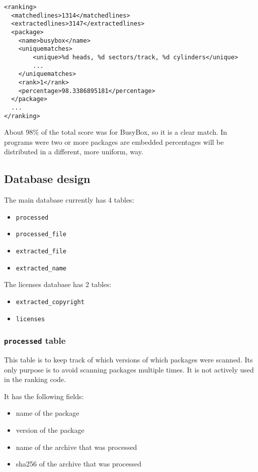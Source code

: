 \documentclass[10pt]{article}
\begin{document}
\begin{verbatim}
<ranking>
  <matchedlines>1314</matchedlines>
  <extractedlines>3147</extractedlines>
  <package>
    <name>busybox</name>
    <uniquematches>
        <unique>%d heads, %d sectors/track, %d cylinders</unique>
        ...
    </uniquematches>
    <rank>1</rank>
    <percentage>98.3386895181</percentage>
  </package>
  ...
</ranking>
\end{verbatim}

About 98\% of the total score was for BusyBox, so it is a clear match. In
programs were two or more packages are embedded percentages will be distributed
in a different, more uniform, way.

\subsection{Database design}

The main database currently has 4 tables:

\begin{itemize}
\item \texttt{processed}
\item \texttt{processed\_file}
\item \texttt{extracted\_file}
\item \texttt{extracted\_name}
\end{itemize}

The licenses database has 2 tables:

\begin{itemize}
\item \texttt{extracted\_copyright}
\item \texttt{licenses}
\end{itemize}

\subsubsection{\texttt{processed} table}

This table is to keep track of which versions of which packages were scanned.
Its only purpose is to avoid scanning packages multiple times. It is not
actively used in the ranking code.

It has the following fields:

\begin{itemize}
\item name of the package
\item version of the package
\item name of the archive that was processed
\item sha256 of the archive that was processed
\end{itemize}
\end{document}
